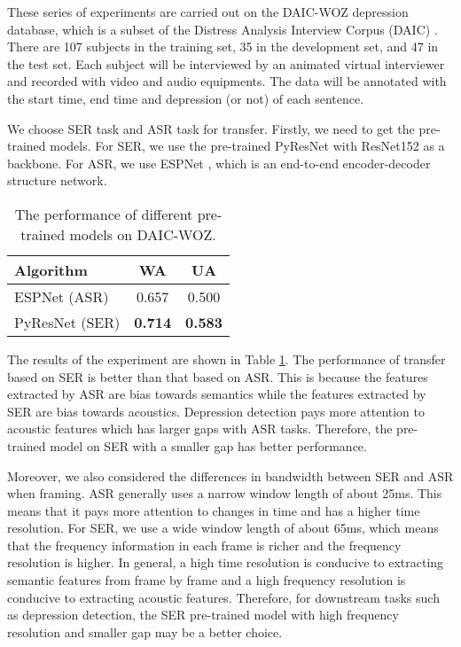 \documentclass{article}
\begin{document}
These series of experiments are carried out on the DAIC-WOZ depression database, which is a subset of the Distress Analysis Interview Corpus (DAIC) \cite{gratch2014distress}.
There are 107 subjects in the training set, 35 in the development set, and 47 in the test set.
Each subject will be interviewed by an animated virtual interviewer and recorded with video and audio equipments.
The data will be annotated with the start time, end time and depression (or not) of each sentence.

We choose SER task and ASR task for transfer.
Firstly, we need to get the pre-trained models.
For SER, we use the pre-trained PyResNet with ResNet152 as a backbone.
For ASR, we use ESPNet \cite{watanabe2018espnet}, which is an end-to-end encoder-decoder structure network.


\begin{table}[htbp]
  \caption{The performance of different pre-trained models on DAIC-WOZ.}
  \label{tab:results_2}
\centering
  \begin{tabular}{ lcc }
    \hline
    \textbf{Algorithm} & \textbf{WA} & \textbf{UA}\\
    \hline
    ESPNet (ASR)        &   0.657  &   0.500  \\
    PyResNet  (SER)        &   \textbf{0.714}   &   \textbf{0.583}  \\
    \hline
    \end{tabular}
\end{table}

The results of the experiment are shown in Table \ref{tab:results_2}.
The performance of transfer based on SER is better than that based on ASR.
This is because the features extracted by ASR are bias towards semantics while the features extracted by SER are bias towards acoustics.
Depression detection pays more attention to acoustic features which has larger gaps with ASR tasks.
Therefore, the pre-trained model on SER with a smaller gap has better performance.

Moreover, we also considered the differences in bandwidth between SER and ASR when framing.
ASR generally uses a narrow window length of about 25ms. This means that it pays more attention to changes in time and has a higher time resolution.
For SER, we use a wide window length of about 65ms, which means that the frequency information in each frame is richer and the frequency resolution is higher.
In general, a high time resolution is conducive to extracting semantic features from frame by frame and a high frequency resolution is conducive to extracting acoustic features.
Therefore, for downstream tasks such as depression detection, the SER pre-trained model with high frequency resolution and smaller gap may be a better choice.
\end{document}
